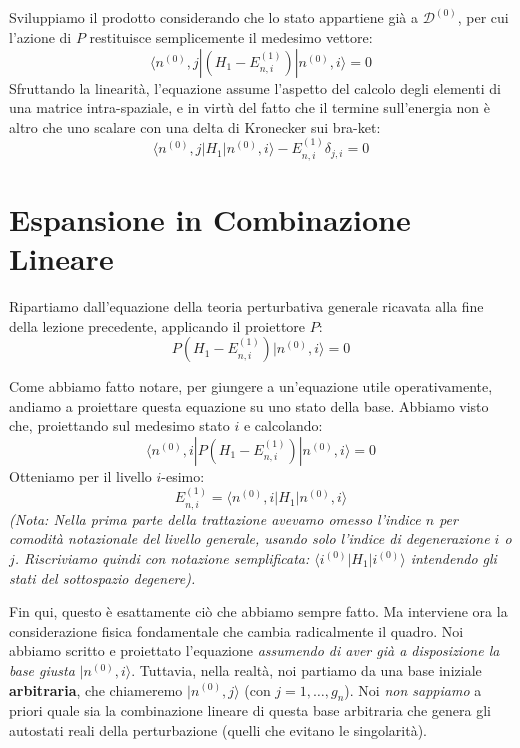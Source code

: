 Sviluppiamo il prodotto considerando che lo stato appartiene già a $\mathcal{D}^{(0)}$, per cui l'azione di $P$ restituisce semplicemente il medesimo vettore:
\begin{equation}
\langle n^{(0)}, j | \left( H_1 - E_{n,i}^{(1)} \right) |n^{(0)}, i\rangle = 0
\end{equation}
Sfruttando la linearità, l'equazione assume l'aspetto del calcolo degli elementi di una matrice intra-spaziale, e in virtù del fatto che il termine sull'energia non è altro che uno scalare con una delta di Kronecker sui bra-ket:
\begin{equation}
\langle n^{(0)}, j | H_1 |n^{(0)}, i\rangle - E_{n,i}^{(1)} \delta_{j,i} = 0
\end{equation}

\section{Espansione in Combinazione Lineare}

Ripartiamo dall'equazione della teoria perturbativa generale ricavata alla fine della lezione precedente, applicando il proiettore $P$:
\begin{equation}
P (H_1 - E_{n,i}^{(1)}) |n^{(0)}, i\rangle = 0
\end{equation}

Come abbiamo fatto notare, per giungere a un'equazione utile operativamente, andiamo a proiettare questa equazione su uno stato della base. Abbiamo visto che, proiettando sul medesimo stato $i$ e calcolando:
\begin{equation}
\langle n^{(0)}, i | P (H_1 - E_{n,i}^{(1)}) |n^{(0)}, i\rangle = 0
\end{equation}
Otteniamo per il livello $i$-esimo:
\begin{equation}
E_{n,i}^{(1)} = \langle n^{(0)}, i | H_1 | n^{(0)}, i \rangle
\end{equation}
\textit{(Nota: Nella prima parte della trattazione avevamo omesso l'indice $n$ per comodità notazionale del livello generale, usando solo l'indice di degenerazione $i$ o $j$. Riscriviamo quindi con notazione semplificata: $\langle i^{(0)} \vert{} H_1 \vert{} i^{(0)} \rangle$ intendendo gli stati del sottospazio degenere).}

Fin qui, questo è esattamente ciò che abbiamo sempre fatto. Ma interviene ora la considerazione fisica fondamentale che cambia radicalmente il quadro.
Noi abbiamo scritto e proiettato l'equazione \textit{assumendo di aver già a disposizione la base giusta} $\vert{}n^{(0)}, i\rangle$.
Tuttavia, nella realtà, noi partiamo da una base iniziale \textbf{arbitraria}, che chiameremo $\vert{}n^{(0)}, j\rangle$ (con $j = 1, \dots, g_n$). Noi \textit{non sappiamo} a priori quale sia la combinazione lineare di questa base arbitraria che genera gli autostati reali della perturbazione (quelli che evitano le singolarità).

